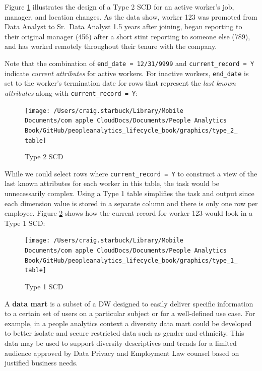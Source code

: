 \documentclass[
]{book}
\begin{document}
Figure \ref{fig:type-2-tbl} illustrates the design of a Type 2 SCD for an active worker's job, manager, and location changes. As the data show, worker 123 was promoted from Data Analyst to Sr.~Data Analyst 1.5 years after joining, began reporting to their original manager (456) after a short stint reporting to someone else (789), and has worked remotely throughout their tenure with the company.

Note that the combination of \texttt{end\_date\ =\ \textquotesingle{}12/31/9999\textquotesingle{}} and \texttt{current\_record\ =\ \textquotesingle{}Y\textquotesingle{}} indicate \emph{current attributes} for active workers. For inactive workers, \texttt{end\_date} is set to the worker's termination date for rows that represent the \emph{last known attributes} along with \texttt{current\_record\ =\ \textquotesingle{}Y\textquotesingle{}}:

\begin{figure}

{\centering \texttt{[image: /Users/craig.starbuck/Library/Mobile Documents/com~apple~CloudDocs/Documents/People Analytics Book/GitHub/peopleanalytics\_lifecycle\_book/graphics/type\_2\_table]} 

}

\caption{Type 2 SCD}\label{fig:type-2-tbl}
\end{figure}

While we could select rows where \texttt{current\_record\ =\ \textquotesingle{}Y\textquotesingle{}} to construct a view of the last known attributes for each worker in this table, the task would be unnecessarily complex. Using a Type 1 table simplifies the task and output since each dimension value is stored in a separate column and there is only one row per employee. Figure \ref{fig:type-1-tbl} shows how the current record for worker 123 would look in a Type 1 SCD:

\begin{figure}

{\centering \texttt{[image: /Users/craig.starbuck/Library/Mobile Documents/com~apple~CloudDocs/Documents/People Analytics Book/GitHub/peopleanalytics\_lifecycle\_book/graphics/type\_1\_table]} 

}

\caption{Type 1 SCD}\label{fig:type-1-tbl}
\end{figure}

A \textbf{data mart} is a subset of a DW designed to easily deliver specific information to a certain set of users on a particular subject or for a well-defined use case. For example, in a people analytics context a diversity data mart could be developed to better isolate and secure restricted data such as gender and ethnicity. This data may be used to support diversity descriptives and trends for a limited audience approved by Data Privacy and Employment Law counsel based on justified business needs.
\end{document}
